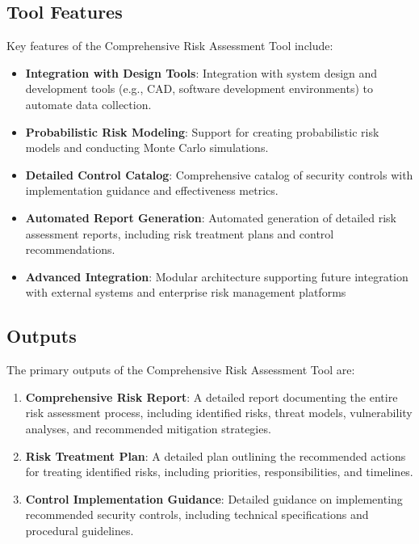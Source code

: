 \documentclass[binding=0.6cm]{sapthesis}
\begin{document}
\subsection{Tool Features}

Key features of the Comprehensive Risk Assessment Tool include:

\begin{itemize}
    \item \textbf{Integration with Design Tools}: Integration with system design and development tools (e.g., CAD, software development environments) to automate data collection.
    \item \textbf{Probabilistic Risk Modeling}: Support for creating probabilistic risk models and conducting Monte Carlo simulations.
    \item \textbf{Detailed Control Catalog}: Comprehensive catalog of security controls with implementation guidance and effectiveness metrics.
    \item \textbf{Automated Report Generation}: Automated generation of detailed risk assessment reports, including risk treatment plans and control recommendations.
    \item \textbf{Advanced Integration}: Modular architecture supporting future integration with external systems and enterprise risk management platforms
\end{itemize}

\subsection{Outputs}

The primary outputs of the Comprehensive Risk Assessment Tool are:

\begin{enumerate}
    \item \textbf{Comprehensive Risk Report}: A detailed report documenting the entire risk assessment process, including identified risks, threat models, vulnerability analyses, and recommended mitigation strategies.
    \item \textbf{Risk Treatment Plan}: A detailed plan outlining the recommended actions for treating identified risks, including priorities, responsibilities, and timelines.
    \item \textbf{Control Implementation Guidance}: Detailed guidance on implementing recommended security controls, including technical specifications and procedural guidelines.
\end{enumerate}
\end{document}
